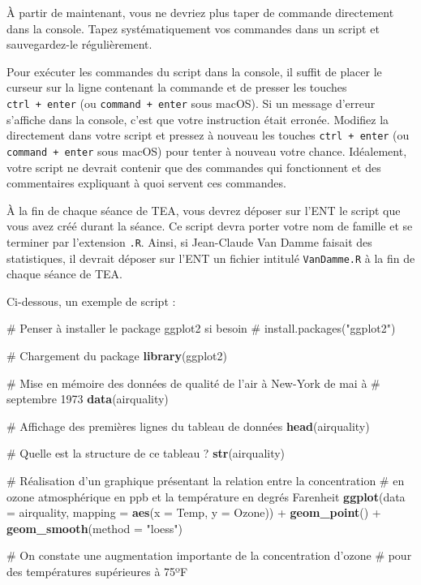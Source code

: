 \documentclass[a4paperpaper,]{article}
\newenvironment{Shaded}{\begin{snugshade}}{\end{snugshade}}
\newcommand{\CommentTok}[1]{\textcolor[rgb]{0.54,0.53,0.53}{#1}}
\newcommand{\DataTypeTok}[1]{\textcolor[rgb]{0.00,0.34,0.68}{#1}}
\newcommand{\KeywordTok}[1]{\textcolor[rgb]{0.12,0.11,0.11}{\textbf{#1}}}
\newcommand{\NormalTok}[1]{\textcolor[rgb]{0.12,0.11,0.11}{#1}}
\newcommand{\OperatorTok}[1]{\textcolor[rgb]{0.12,0.11,0.11}{#1}}
\newcommand{\StringTok}[1]{\textcolor[rgb]{0.75,0.01,0.01}{#1}}
\begin{document}
À partir de maintenant, vous ne devriez plus taper de commande directement dans la console. Tapez systématiquement vos commandes dans un script et sauvegardez-le régulièrement.

Pour exécuter les commandes du script dans la console, il suffit de placer le curseur sur la ligne contenant la commande et de presser les touches \texttt{ctrl\ +\ enter} (ou \texttt{command\ +\ enter} sous macOS). Si un message d'erreur s'affiche dans la console, c'est que votre instruction était erronée. Modifiez la directement dans votre script et pressez à nouveau les touches \texttt{ctrl\ +\ enter} (ou \texttt{command\ +\ enter} sous macOS) pour tenter à nouveau votre chance. Idéalement, votre script ne devrait contenir que des commandes qui fonctionnent et des commentaires expliquant à quoi servent ces commandes.

À la fin de chaque séance de TEA, vous devrez déposer sur l'ENT le script que vous avez créé durant la séance. Ce script devra porter votre nom de famille et se terminer par l'extension \texttt{.R}. Ainsi, si Jean-Claude Van Damme faisait des statistiques, il devrait déposer sur l'ENT un fichier intitulé \texttt{VanDamme.R} à la fin de chaque séance de TEA.

Ci-dessous, un exemple de script :

\begin{Shaded}
\begin{Highlighting}[]
\CommentTok{# Penser à installer le package ggplot2 si besoin}
\CommentTok{# install.packages("ggplot2")}

\CommentTok{# Chargement du package}
\KeywordTok{library}\NormalTok{(ggplot2)}

\CommentTok{# Mise en mémoire des données de qualité de l'air à New-York de mai à}
\CommentTok{# septembre 1973}
\KeywordTok{data}\NormalTok{(airquality)}

\CommentTok{# Affichage des premières lignes du tableau de données}
\KeywordTok{head}\NormalTok{(airquality)}

\CommentTok{# Quelle est la structure de ce tableau ?}
\KeywordTok{str}\NormalTok{(airquality)}

\CommentTok{# Réalisation d'un graphique présentant la relation entre la concentration}
\CommentTok{# en ozone atmosphérique en ppb et la température en degrés Farenheit}
\KeywordTok{ggplot}\NormalTok{(}\DataTypeTok{data =}\NormalTok{ airquality, }\DataTypeTok{mapping =} \KeywordTok{aes}\NormalTok{(}\DataTypeTok{x =}\NormalTok{ Temp, }\DataTypeTok{y =}\NormalTok{ Ozone)) }\OperatorTok{+}
\StringTok{  }\KeywordTok{geom_point}\NormalTok{() }\OperatorTok{+}
\StringTok{  }\KeywordTok{geom_smooth}\NormalTok{(}\DataTypeTok{method =} \StringTok{"loess"}\NormalTok{)}

\CommentTok{# On constate une augmentation importante de la concentration d'ozone }
\CommentTok{# pour des températures supérieures à 75ºF}
\end{Highlighting}
\end{Shaded}
\end{document}
